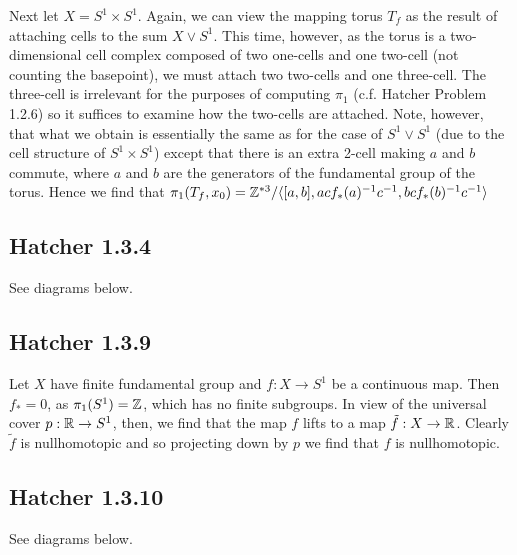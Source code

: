 \documentclass{../mathnotes}
\begin{document}
Next let $X=S^1\times S^1$. Again, we can view the mapping torus $T_f$ as the result of attaching cells to
the sum $X\vee S^1$. This time, however, as the torus is a two-dimensional cell complex composed of two
one-cells and one two-cell (not counting the basepoint), we must attach two two-cells and one three-cell.
The three-cell is irrelevant for the purposes of computing $\pi_1$ (c.f. Hatcher Problem 1.2.6) so it suffices
to examine how the two-cells are attached. Note, however, that what we obtain is essentially the same as
for the case of $S^1\vee S^1$ (due to the cell structure of $S^1\times S^1$) except that there is an extra
2-cell making $a$ and $b$ commute, where $a$ and $b$ are the generators of the fundamental group of the torus.
Hence we find that $\pi_1(T_f,x_0)=\mathbb{Z}^{*3}/\langle [a,b],acf_*(a)^{-1}c^{-1}, bcf_*(b)^{-1}c^{-1}\rangle$

\subsection*{Hatcher 1.3.4}
See diagrams below.

\subsection*{Hatcher 1.3.9}
Let $X$ have finite fundamental group and $f:X\to S^1$ be a continuous map. Then $f_*=0$, as $\pi_1(S^1)=\mathbb{Z}$,
which has no finite subgroups. In view of the universal cover $p:\mathbb{R}\to S^1$, then, we find that the map $f$
lifts to a map $\tilde f:X\to\mathbb{R}$. Clearly $\tilde f$ is nullhomotopic and so projecting down by $p$ we find
that $f$ is nullhomotopic.

\subsection*{Hatcher 1.3.10}
See diagrams below.
\end{document}
